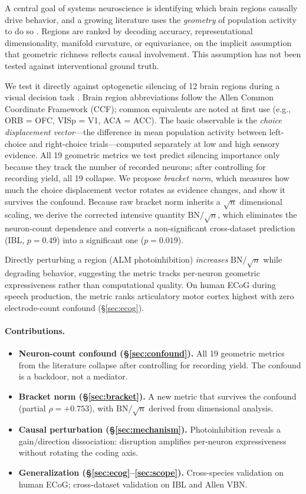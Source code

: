 \documentclass{article}
\begin{document}
A central goal of systems neuroscience is identifying which brain regions causally drive behavior, and a growing literature uses the \emph{geometry} of population activity to do so \citep{cunningham2014dimensionality, gallego2017neural}. Regions are ranked by decoding accuracy, representational dimensionality, manifold curvature, or equivariance, on the implicit assumption that geometric richness reflects causal involvement. This assumption has not been tested against interventional ground truth.

We test it directly against optogenetic silencing of 12 brain regions during a visual decision task \citep{steinmetz2019distributed, zatkahaas2021}. Brain region abbreviations follow the Allen Common Coordinate Framework (CCF); common equivalents are noted at first use (e.g., ORB = OFC, VISp = V1, ACA = ACC). The basic observable is the \emph{choice displacement vector}---the difference in mean population activity between left-choice and right-choice trials---computed separately at low and high sensory evidence. All 19 geometric metrics we test predict silencing importance only because they track the number of recorded neurons; after controlling for recording yield, all 19 collapse. We propose \emph{bracket norm}, which measures how much the choice displacement vector rotates as evidence changes, and show it survives the confound. Because raw bracket norm inherits a $\sqrt{n}$ dimensional scaling, we derive the corrected intensive quantity $\text{BN}/\!\sqrt{n}$, which eliminates the neuron-count dependence and converts a non-significant cross-dataset prediction (IBL, $p = 0.49$) into a significant one ($p = 0.019$).

Directly perturbing a region (ALM photoinhibition) \emph{increases} $\text{BN}/\!\sqrt{n}$ while degrading behavior, suggesting the metric tracks per-neuron geometric expressiveness rather than computational quality. On human ECoG during speech production, the metric ranks articulatory motor cortex highest with zero electrode-count confound (\S\ref{sec:ecog}).

\paragraph{Contributions.}
\begin{itemize}
\item \textbf{Neuron-count confound (\S\ref{sec:confound}).} All 19 geometric metrics from the literature collapse after controlling for recording yield. The confound is a backdoor, not a mediator.
\item \textbf{Bracket norm (\S\ref{sec:bracket}).} A new metric that survives the confound (partial $\rho = +0.753$), with $\text{BN}/\!\sqrt{n}$ derived from dimensional analysis.
\item \textbf{Causal perturbation (\S\ref{sec:mechanism}).} Photoinhibition reveals a gain/direction dissociation: disruption amplifies per-neuron expressiveness without rotating the coding axis.
\item \textbf{Generalization (\S\ref{sec:ecog}--\ref{sec:scope}).} Cross-species validation on human ECoG; cross-dataset validation on IBL and Allen VBN.
\end{itemize}
\end{document}
